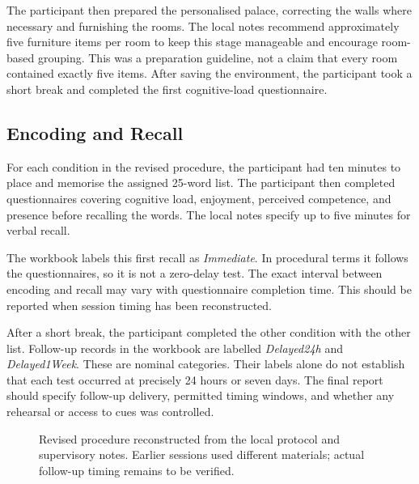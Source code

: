 The participant then prepared the personalised palace, correcting the walls where necessary and furnishing the rooms. The local notes recommend approximately five furniture items per room to keep this stage manageable and encourage room-based grouping. This was a preparation guideline, not a claim that every room contained exactly five items. After saving the environment, the participant took a short break and completed the first cognitive-load questionnaire.

\subsection{Encoding and Recall}
For each condition in the revised procedure, the participant had ten minutes to place and memorise the assigned 25-word list. The participant then completed questionnaires covering cognitive load, enjoyment, perceived competence, and presence before recalling the words. The local notes specify up to five minutes for verbal recall.

The workbook labels this first recall as \emph{Immediate}. In procedural terms it follows the questionnaires, so it is not a zero-delay test. The exact interval between encoding and recall may vary with questionnaire completion time. This should be reported when session timing has been reconstructed.

After a short break, the participant completed the other condition with the other list. Follow-up records in the workbook are labelled \emph{Delayed24h} and \emph{Delayed1Week}. These are nominal categories. Their labels alone do not establish that each test occurred at precisely 24 hours or seven days. The final report should specify follow-up delivery, permitted timing windows, and whether any rehearsal or access to cues was controlled.

\begin{figure}[htbp]
\centering
{}
\caption{Revised procedure reconstructed from the local protocol and supervisory notes. Earlier sessions used different materials; actual follow-up timing remains to be verified.}
\label{fig:procedure}
\end{figure}

